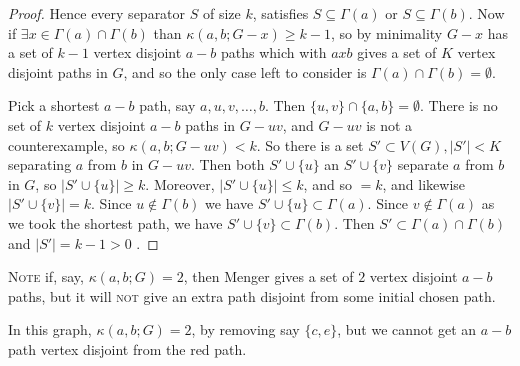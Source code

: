 \documentclass[10pt,a4paper]{article}
\begin{document}
\begin{proof}
Hence every separator $S$ of size $k$, satisfies $S\subseteq \Gamma(a)$ or $S\subseteq \Gamma(b)$. Now if $\exists x \in \Gamma(a) \cap \Gamma(b)$ than $\kappa(a,b;G-x) \geq k-1$, so by minimality $G-x$ has a set of $k-1$ vertex disjoint $a-b$ paths which with $axb$ gives a set of $K$ vertex disjoint paths in $G$, and so the only case left to consider is $\Gamma(a) \cap \Gamma(b) = \emptyset$.

Pick a shortest $a-b$ path, say $a,u,v,\ldots,b$. Then $\{u,v\}\cap\{a,b\}=\emptyset$. There is no set of $k$ vertex disjoint $a-b$ paths in $G-uv$, and $G-uv$ is not a counterexample, so $\kappa(a,b;G-uv)<k$. So there is a set $S'\subset V(G), |S'|<K$ separating $a$ from $b$ in $G-uv$. Then both $S'\cup\{u\}$ an $S'\cup\{v\}$ separate $a$ from $b$ in $G$, so $|S'\cup\{u\}|\geq k$. Moreover, $|S'\cup \{u\}| \leq k$, and so $=k$, and likewise $|S'\cup\{v\}|=k$. Since $u\notin\Gamma(b)$ we have $S'\cup\{u\}\subset \Gamma(a)$. Since $v\notin\Gamma(a)$ as we took the shortest path, we have $S'\cup\{v\}\subset \Gamma(b)$. Then $S'\subset \Gamma(a)\cap \Gamma(b)$ and $|S'|=k-1>0$ \contr.
\end{proof}

\textsc{Note} if, say, $\kappa(a,b;G) = 2$, then Menger gives a set of $2$ vertex disjoint $a-b$ paths, but it will \textsc{not} give an extra path disjoint from some initial chosen path. 
\begin{center}
\end{center}
In this graph, $\kappa(a,b;G) = 2$, by removing say $\{c, e\}$, but we cannot get an $a-b$ path vertex disjoint from the red path.
\end{document}
